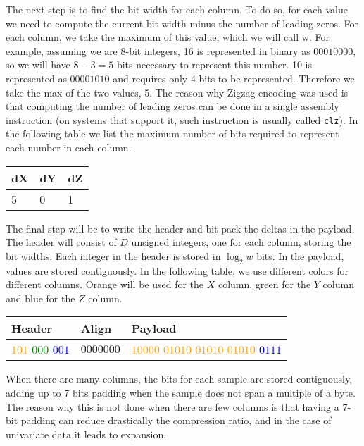The next step is to find the bit width for each column. To do so, for each value we need to
compute the current bit width minus the number of leading zeros. For each column, we take
the maximum of this value, which we will call w. For example, assuming we are 8-bit integers,
16 is represented in binary as $00010000$, so we will have $8 - 3 = 5$ bits necessary to represent
this number. 10 is represented as $00001010$ and requires only 4 bits to be represented.
Therefore we take the max of the two values, 5. The reason why Zigzag encoding was used is
that computing the number of leading zeros can be done in a single assembly instruction
(on systems that support it, such instruction is usually called \texttt{clz}). In the following table
we list the maximum number of bits required to represent each number in each column.
\begin{table}[!htbp]
\centering
\begin{tabular}{l|l|l}
\textbf{dX} & \textbf{dY} & \textbf{dZ} \\ 
\hline
5 & 0 & 1 \\
\end{tabular}
\end{table}

The final step will be to write the header and bit pack the deltas in the payload.
The header will consist of $D$ unsigned integers, one for each column, storing the bit widths.
Each integer in the header is stored in $\log_2{w}$ bits.
In the payload, values are stored contiguously.
In the following table, we use different colors for different columns. Orange will be used
for the $X$ column, green for the $Y$ column and blue for the $Z$ column.

\begin{table}[!htbp]
\centering
\begin{tabular}{l|l|l}
\textbf{Header} & \textbf{Align} & \textbf{Payload} \\ 
\hline
\textcolor{orange}{$101$} \textcolor{green}{$000$} \textcolor{blue}{$001$} & $0000000$ & \textcolor{orange}{$10000$ $01010$ $01010$ $01010$} \textcolor{blue}{$0111$} \\
\end{tabular}
\end{table}

When there are many columns, the bits for each sample are stored contiguously, adding up to
7 bits padding when the sample does not span a multiple of a byte. The reason why this is
not done when there are few columns is that having a 7-bit padding can reduce drastically
the compression ratio, and in the case of univariate data it leads to expansion.

